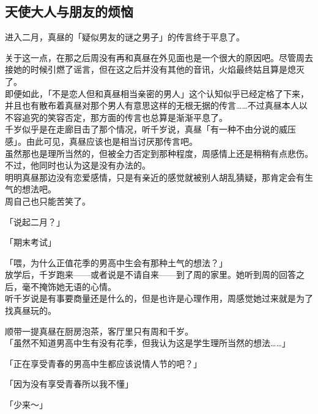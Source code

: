 \subsection{天使大人与朋友的烦恼}

进入二月，真昼的「疑似男友的谜之男子」的传言终于平息了。

关于这一点，在那之后周没有再和真昼在外见面也是一个很大的原因吧。尽管周去接她的时候引燃了谣言，但在这之后并没有其他的音讯，火焰最终姑且算是熄灭了。\\

即便如此，「不是恋人但和真昼相当亲密的男人」这个认知似乎已经定格了下来，并且也有散布着真昼对那个男人有意思这样的无根无据的传言……不过真昼本人以不容追究的笑容否定，那方面的传言也总算是渐渐平息了。\\

千岁似乎是在走廊目击了那个情况，听千岁说，真昼「有一种不由分说的威压感」。由此可见，真昼应该也是相当讨厌那传言吧。\\

虽然那也是理所当然的，但被全力否定到那种程度，周感情上还是稍稍有点悲伤。不过，他同时也认为这是没有办法的。\\

明明真昼那边没有恋爱感情，只是有亲近的感觉就被别人胡乱猜疑，那肯定会有生气的想法吧。\\

周自己也只能苦笑了。\\

\vspace{2\baselineskip}

「说起二月？」

「期末考试」

「喂，为什么正值花季的男高中生会有那种土气的想法？」\\

放学后，千岁跑来——或者说是不请自来——到了周的家里。她听到周的回答之后，毫不掩饰她无语的心情。\\

听千岁说是有事要商量还是什么的，但是也许是心理作用，周感觉她过来就是为了找真昼玩的。

顺带一提真昼在厨房泡茶，客厅里只有周和千岁。\\

「虽然不知道男高中生有没有花季，但我认为这是学生理所当然的想法……」

「正在享受青春的男高中生都应该说情人节的吧？」

「因为没有享受青春所以我不懂」

「少来～」\\

